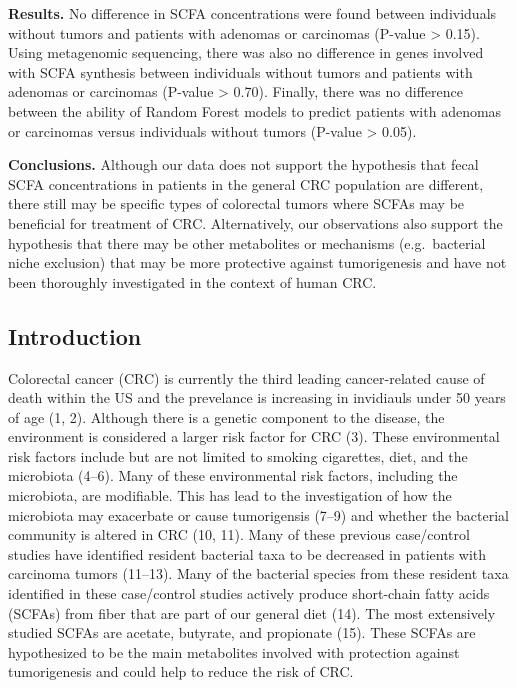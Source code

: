 \documentclass[11pt,]{article}
\begin{document}
\textbf{Results.} No difference in SCFA concentrations were found
between individuals without tumors and patients with adenomas or
carcinomas (P-value \textgreater{} 0.15). Using metagenomic sequencing,
there was also no difference in genes involved with SCFA synthesis
between individuals without tumors and patients with adenomas or
carcinomas (P-value \textgreater{} 0.70). Finally, there was no
difference between the ability of Random Forest models to predict
patients with adenomas or carcinomas versus individuals without tumors
(P-value \textgreater{} 0.05).

\textbf{Conclusions.} Although our data does not support the hypothesis
that fecal SCFA concentrations in patients in the general CRC population
are different, there still may be specific types of colorectal tumors
where SCFAs may be beneficial for treatment of CRC. Alternatively, our
observations also support the hypothesis that there may be other
metabolites or mechanisms (e.g.~bacterial niche exclusion) that may be
more protective against tumorigenesis and have not been thoroughly
investigated in the context of human CRC.

\newpage

\subsection{Introduction}\label{introduction}

Colorectal cancer (CRC) is currently the third leading cancer-related
cause of death within the US and the prevelance is increasing in
invidiauls under 50 years of age (1, 2). Although there is a genetic
component to the disease, the environment is considered a larger risk
factor for CRC (3). These environmental risk factors include but are not
limited to smoking cigarettes, diet, and the microbiota (4--6). Many of
these environmental risk factors, including the microbiota, are
modifiable. This has lead to the investigation of how the microbiota may
exacerbate or cause tumorigensis (7--9) and whether the bacterial
community is altered in CRC (10, 11). Many of these previous
case/control studies have identified resident bacterial taxa to be
decreased in patients with carcinoma tumors (11--13). Many of the
bacterial species from these resident taxa identified in these
case/control studies actively produce short-chain fatty acids (SCFAs)
from fiber that are part of our general diet (14). The most extensively
studied SCFAs are acetate, butyrate, and propionate (15). These SCFAs
are hypothesized to be the main metabolites involved with protection
against tumorigenesis and could help to reduce the risk of CRC.
\end{document}
